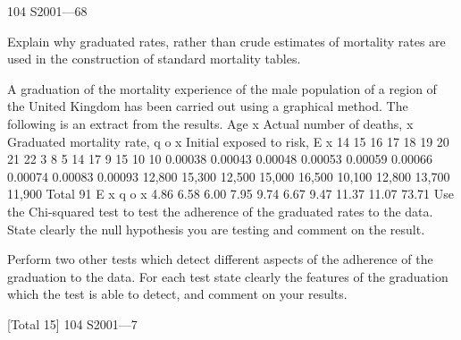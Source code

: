 \documentclass[a4paper,1pt]{article}
\begin{document}
104 S2001—68
\item  Explain why graduated rates, rather than crude estimates of mortality
rates are used in the construction of standard mortality tables.

\item  A graduation of the mortality experience of the male population of a
region of the United Kingdom has been carried out using a graphical
method. The following is an extract from the results.
Age x Actual number
of deaths, \theta x Graduated
mortality rate, q o x Initial exposed
to risk, E x
14
15
16
17
18
19
20
21
22 3
8
5
14
17
9
15
10
10 0.00038
0.00043
0.00048
0.00053
0.00059
0.00066
0.00074
0.00083
0.00093 12,800
15,300
12,500
15,000
16,500
10,100
12,800
13,700
11,900
Total 91
E x q o x
4.86
6.58
6.00
7.95
9.74
6.67
9.47
11.37
11.07
73.71
Use the Chi-squared test to test the adherence of the graduated rates to
the data. State clearly the null hypothesis you are testing and comment
on the result.

\item 
Perform two other tests which detect different aspects of the adherence of
the graduation to the data. For each test state clearly the features of the
graduation which the test is able to detect, and comment on your results.

[Total 15]
104 S2001—7
\end{document}
